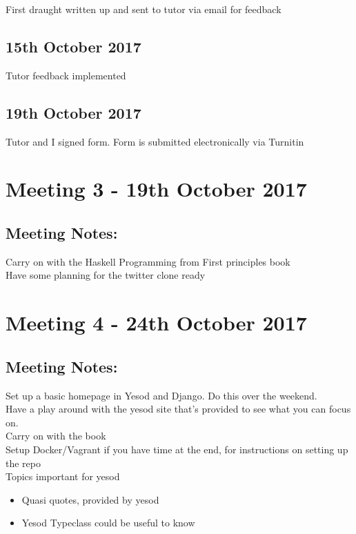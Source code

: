 \documentclass[a4paper,11pt]{article}
\begin{document}
First draught written up and sent to tutor via email for feedback

\subsection{15th October 2017}

Tutor feedback implemented

\subsection{19th October 2017}

Tutor and I signed form. Form is submitted electronically via Turnitin

\section{Meeting 3 - 19th October 2017}

\subsection{Meeting Notes:}

Carry on with the Haskell Programming from First principles book\\
Have some planning for the twitter clone ready

\section{Meeting 4 - 24th October 2017}

\subsection{Meeting Notes:}

Set up a basic homepage in Yesod and Django. Do this over the weekend.\\
Have a play around with the yesod site that’s provided to see what you can focus on.\\
Carry on with the book\\
Setup Docker/Vagrant if you have time at the end, for instructions on setting up the repo\\
Topics important for yesod
\begin{itemize}
  \item Quasi quotes, provided by yesod
  \item Yesod Typeclass could be useful to know
\end{itemize}
\end{document}
